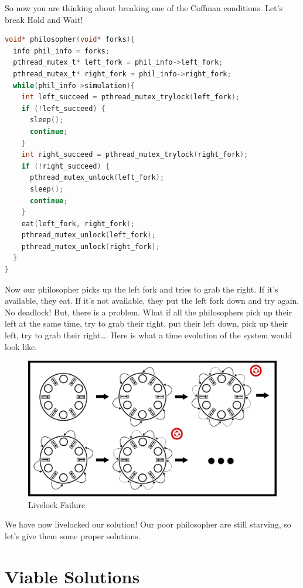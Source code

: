 So now you are thinking about breaking one of the Coffman conditions.
Let's break Hold and Wait!

\begin{lstlisting}[language=C]
void* philosopher(void* forks){
  info phil_info = forks;
  pthread_mutex_t* left_fork = phil_info->left_fork;
  pthread_mutex_t* right_fork = phil_info->right_fork;
  while(phil_info->simulation){
    int left_succeed = pthread_mutex_trylock(left_fork);
    if (!left_succeed) {
      sleep();
      continue;
    }
    int right_succeed = pthread_mutex_trylock(right_fork);
    if (!right_succeed) {
      pthread_mutex_unlock(left_fork);
      sleep();
      continue;
    }
    eat(left_fork, right_fork);
    pthread_mutex_unlock(left_fork);
    pthread_mutex_unlock(right_fork);
  }
}
\end{lstlisting}

Now our philosopher picks up the left fork and tries to grab the right.
If it's available, they eat.
If it's not available, they put the left fork down and try again.
No deadlock! But, there is a problem.
What if all the philosophers pick up their left at the same time, try to grab their right, put their left down, pick up their left, try to grab their right\ldots{}.
Here is what a time evolution of the system would look like.

\begin{figure}[H]
\centering
\includegraphics[width=.9\textwidth]{deadlock/drawings/dining_livelock.eps}
\caption{Livelock Failure}
\end{figure}

We have now livelocked our solution! Our poor philosopher are still starving, so let's give them some proper solutions.

\section{Viable Solutions}

